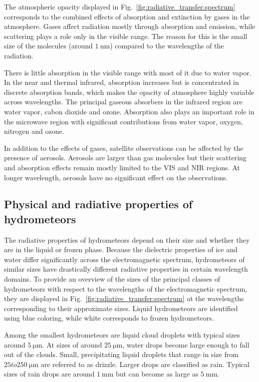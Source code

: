 The atmospheric opacity displayed in Fig.~\ref{fig:radiative_transfer:spectrum}
corresponds to the combined effects of absorption and extinction by gases in the
atmosphere. Gases affect radiation mostly through absorption and emission, while
scattering plays a role only in the visible range. The reason for this is the
small size of the molecules (around $\SI{1}{\nano \meter}$) compared to the
wavelengths of the radiation.

There is little absorption in the visible range with most of it due to water
vapor. In the near and thermal infrared, absorption increases but is concentrated
in discrete absorption bands, which makes the opacity of atmosphere highly
variable across wavelengths. The principal gaseous absorbers in the infrared
region are water vapor, cabon dioxide and ozone. Absorption also plays an
important role in the microwave region with significant contributions from water
vapor, oxygen, nitrogen and ozone. 

In addition to the effects of gases, satellite observations can be affected by
the presence of aerosols. Aerosols are larger than gas molecules but their
scattering and absorption effects remain mostly limited to the VIS and NIR
regions. At longer wavelength, aerosols have no significant effect on the
observations.

\subsection{Physical and radiative properties of hydrometeors}

The radiative properties of hydrometeors depend on their size and whether they
are in the liquid or frozen phase. Because the dielectric properties of ice and
water differ significantly across the electromagnetic spectrum, hydrometeors of
similar sizes have drastically different radiative properties in certain
wavelength domains. To provide an overview of the sizes of the principal classes
of hydrometeors with respect to the wavelengths of the electromagnetic spectrum,
they are displayed in Fig.~\ref{fig:radiative_transfer:spectrum} at the
wavelengths corresponding to their approximate sizes. Liquid hydrometeors are
identified using blue coloring, while white corresponds to frozen hydrometeors.

Among the smallest hydrometeors are liquid cloud droplets with typical sizes
around $\SI{5}{\micro \meter}$. At sizes of around $\SI{25}{\micro \meter}$,
water drops become large enough to fall out of the clouds. Small, precipitating
liquid droplets that range in size from $25 to \SI{250}{\micro \meter}$ are
referred to as drizzle. Larger drops are classified as rain. Typical sizes of
rain drops are around $\SI{1}{\milli \meter}$ but can become as large as
$\SI{5}{\milli \meter}$.

